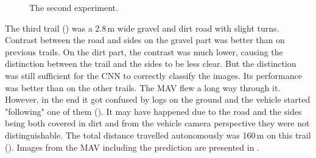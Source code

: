 \begin{figure}[!h]

  \centering

  \centering	
  


  \caption{The second experiment.}
  \label{fig:second_trail_photos}
\end{figure}

The third trail () was a 2.8\,m wide gravel and dirt road with slight turns. Contrast between the road and sides on the gravel part was better than on previous trails. On the dirt part, the contrast was much lower, causing the distinction between the trail and the sides to be less clear. But the distinction was still sufficient for the \acs{CNN} to correctly classify the images. Its performance was better than on the other trails. The \acs{MAV} flew a long way through it. However, in the end it got confused by logs on the ground and the vehicle started "following" one of them (). It may have happened due to the road and the sides being both covered in dirt and from the vehicle camera perspective they were not distinguishable. The total distance travelled autonomously was 160\,m on this trail (). Images from the \acs{MAV} including the prediction are presented in .

